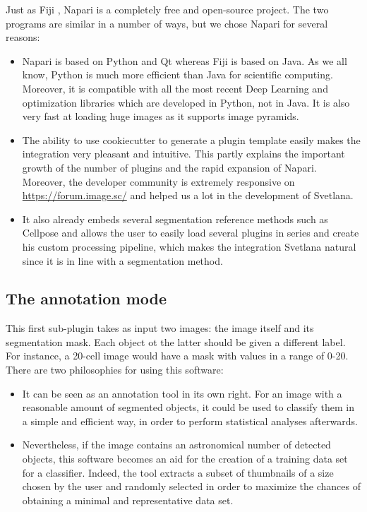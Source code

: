 \documentclass{article}
\begin{document}
Just as Fiji \cite{schindelin2012fiji}, Napari is a completely free and open-source project. The two programs are similar in a number of ways, but we chose Napari for several reasons:
\begin{itemize}
  \item Napari is based on Python and Qt whereas Fiji is based on Java. As we all know, Python is much more efficient than Java for scientific computing. Moreover, it is compatible with all the most recent Deep Learning and optimization libraries which are developed in Python, not in Java. It is also very fast at loading huge images as it supports image pyramids.
  \item The ability to use cookiecutter to generate a plugin template easily makes the integration very pleasant and intuitive. This partly explains the important growth of the number of plugins and the rapid expansion of Napari. Moreover, the developer community is extremely responsive on \url{https://forum.image.sc/} and helped us a lot in the development of Svetlana.
  \item It also already embeds several segmentation reference methods such as Cellpose \cite{stringer2021cellpose} and allows the user to easily load several plugins in series and create his custom processing pipeline, which makes the integration Svetlana natural since it is in line with a segmentation method.
\end{itemize}

\subsection{The annotation mode}

This first sub-plugin takes as input two images: the image itself and its segmentation mask. Each object ot the latter should be given a different label. For instance, a 20-cell image would have a mask with values in a range of 0-20.
\\
There are two philosophies for using this software:
\begin{itemize}
  \item It can be seen as an annotation tool in its own right. For an image with a reasonable amount of segmented objects, it could be used to classify them in a simple and efficient way, in order to perform statistical analyses afterwards.
  \item Nevertheless, if the image contains an astronomical number of detected objects, this software becomes an aid for the creation of a training data set for a classifier. Indeed, the tool extracts a subset of thumbnails of a size chosen by the user and randomly selected in order to maximize the chances of obtaining a minimal and representative data set. 
\end{itemize}
\end{document}
